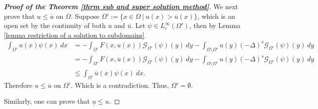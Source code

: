 \documentclass{amsart}
\newcommand{\slap}{(-\Delta)^{s}}
\newcommand{\g}[1]{\mathcal{G}_{#1}}
\begin{document}
\begin{proof}[\textbf{Proof of the Theorem \ref{thrm sub and super solution method}}]
We next prove that $ u\leq \overline{u}$ on $\Omega$. Suppose $\Omega':=\{x\in \Omega ~|~u(x)>\overline{u}(x)\}$, which is an open set by the continuity of both $u$ and $\overline{u}$. Let $\psi\in L_{c}^{\infty}(\Omega')$, then by Lemma \ref{lemma restriction of a solution to subdomains}
\begin{equation*}
    \begin{split}
        \int_{\Omega'}u(x)\psi(x)\ dx&= -\int_{\Omega'}F\left(x,u(x)\right) \g{\Omega'}(\psi)(y) \ dy-\int_{\Omega\setminus\Omega'}u(y)\slap \g{\Omega'}(\psi)(y)\ dy\\
        &=-\int_{\Omega'}F\left(x,\overline{u}(x)\right) \g{\Omega'}(\psi)(y) \ dy-\int_{\Omega\setminus\Omega'}u(y)\slap \g{\Omega'}(\psi)(y)\ dy\\
        &\leq \int_{\Omega'}\overline{u}(x)\psi(x)\ dx.
    \end{split}
\end{equation*}
Therefore $u\leq \overline{u}$ on $\Omega'$. Which is a contradiction. Thus, $\Omega'=\emptyset$. 


Similarly, one can prove that $\underline{u}\leq u$.
\end{proof}
\end{document}
